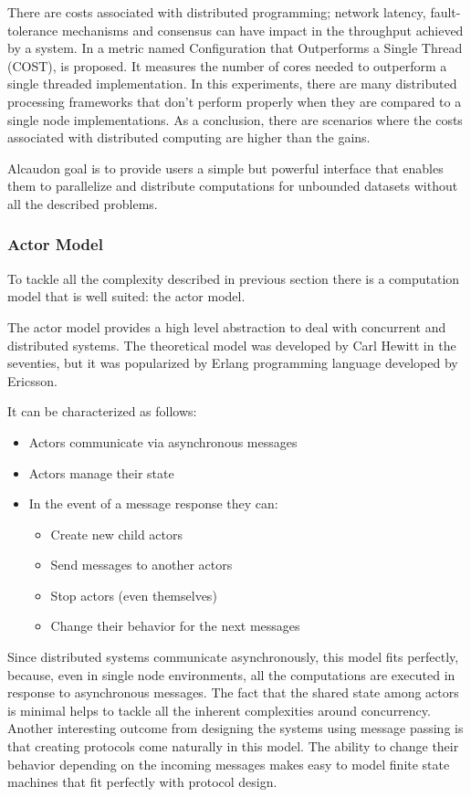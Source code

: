 There are costs associated with distributed programming; network latency,
fault-tolerance mechanisms and consensus can have impact in the throughput
achieved by a system. In \cite{189908} a metric named Configuration that
Outperforms a Single Thread (COST), is proposed. It measures the number of cores
needed to outperform a single threaded implementation. In this experiments,
there are many distributed processing frameworks that don't perform properly
when they are compared to a single node implementations. As a conclusion, there
are scenarios where the costs associated with distributed computing are higher
than the gains.

Alcaudon goal is to provide users a simple but powerful interface that enables
them to parallelize and distribute computations for unbounded datasets without all
the described problems.

\subsubsection{Actor Model}

To tackle all the complexity described in previous section there is a
computation model that is well suited: the actor model.

The actor model provides a high level abstraction to deal with concurrent and
distributed systems. The theoretical model was developed by Carl Hewitt in
the seventies, but it was popularized by Erlang programming language\cite{erlang}
developed by Ericsson.

It can be characterized as follows:
\begin{itemize}
\item Actors communicate via asynchronous messages
\item Actors manage their state
\item In the event of a message response they can:
  \begin{itemize}
  \item Create new child actors
  \item Send messages to another actors
  \item Stop actors (even themselves)
  \item Change their behavior for the next messages
  \end{itemize}
\end{itemize}

Since distributed systems communicate asynchronously, this model fits perfectly,
because, even in single node environments, all the computations are executed in
response to asynchronous messages. The fact that the shared state among actors
is minimal helps to tackle all the inherent complexities around concurrency.
Another interesting outcome from designing the systems using message passing is
that creating protocols come naturally in this model. The ability to change
their behavior depending on the incoming messages makes easy to model finite
state machines that fit perfectly with protocol design.

